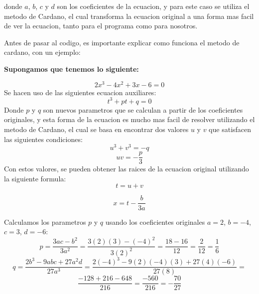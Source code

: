 \documentclass[letterpaper,12pt]{article}
\begin{document}
    donde $a$, $b$, $c$ y $d$ son los coeficientes de la ecuacion, y para este caso se utiliza el metodo de Cardano, el cual transforma la ecuacion original a una forma mas facil de ver la ecuacion, tanto para el programa como para nosotros. 
    
    Antes de pasar al codigo, es importante explicar como funciona el metodo de cardano, con un ejemplo:

    \textbf{Supongamos que tenemos lo siguiente:}

    \begin{equation}
        2x^3 - 4x^2 + 3x - 6 = 0
    \end{equation}
    Se hacen uso de las siguientes ecuacion auxiliares:
    \begin{equation}
        t^3 + pt + q = 0
    \end{equation}  
    Donde $p$ y $q$ son nuevos parametros que se calculan a partir de los coeficientes originales, y esta forma de la ecuacion es mucho mas facil de resolver utilizando el metodo de Cardano, el cual se basa en encontrar dos valores $u$ y $v$ que satisfacen las siguientes condiciones:
    \begin{equation}
        u^3 + v^3 = -q
    \end{equation}
    \begin{equation}
        uv = -\frac{p}{3}
    \end{equation}
        Con estos valores, se pueden obtener las raices de la ecuacion original utilizando la siguiente formula:
    \begin{equation}
        t = u + v
    \end{equation}

    \begin{equation}
            x = t - \frac{b}{3a}
    \end{equation}

    Calculamos los parametros $p$ y $q$ usando los coeficientes originales $a=2$, $b=-4$, $c=3$, $d=-6$:
    \begin{equation}
        p = \frac{3ac - b^2}{3a^2} = \frac{3(2)(3) - (-4)^2}{3(2)^2} = \frac{18 - 16}{12} = \frac{2}{12} = \frac{1}{6}
    \end{equation}
    \begin{equation}
        q = \frac{2b^3 - 9abc + 27a^2d}{27a^3} = \frac{2(-4)^3 - 9(2)(-4)(3) + 27(4)(-6)}{27(8)} = 
    \end{equation}
    \begin{equation}
        \frac{-128 + 216 - 648}{216} = \frac{-560}{216} = -\frac{70}{27}
    \end{equation}
\end{document}
